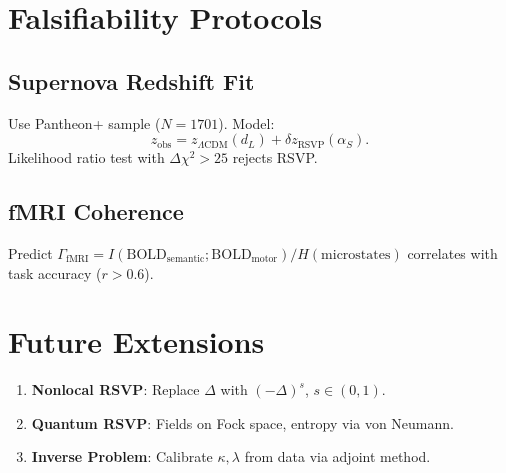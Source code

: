 \documentclass[11pt]{article}
\theoremstyle{definition}
\theoremstyle{remark}
\begin{document}
\section{Falsifiability Protocols}
\label{app:test}

\subsection{Supernova Redshift Fit}
Use Pantheon+ sample ($N=1701$). Model:
\[
z_{\mathrm{obs}} = z_{\Lambda\mathrm{CDM}}(d_L) + \delta z_{\mathrm{RSVP}}(\alpha_S).
\]
Likelihood ratio test with $\Delta\chi^2 > 25$ rejects RSVP.

\subsection{fMRI Coherence}
Predict $\Gamma_{\mathrm{fMRI}} = I(\text{BOLD}_{\text{semantic}}; \text{BOLD}_{\text{motor}})/H(\text{microstates})$ correlates with task accuracy ($r > 0.6$).

\section{Future Extensions}
\label{app:future}

\begin{enumerate}
\item \textbf{Nonlocal RSVP}: Replace $\Delta$ with $(-\Delta)^s$, $s \in (0,1)$.
\item \textbf{Quantum RSVP}: Fields on Fock space, entropy via von Neumann.
\item \textbf{Inverse Problem}: Calibrate $\kappa, \lambda$ from data via adjoint method.
\end{enumerate}



\end{document}
